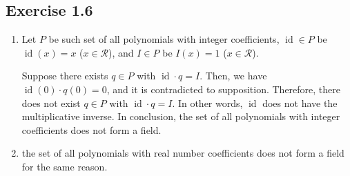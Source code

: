 \documentclass{article}
\newcommand\R{\mathcal R}
\DeclareMathOperator \id{id}
\begin{document}
\subsection{Exercise 1.6}
\begin{enumerate}[label = (\alph*)]
\item
Let $P$ be such set of all polynomials with integer coefficients, %
$\id \in P$ be $\id(x) = x$ ($x \in \R$), and 
$I \in P$ be $I(x) = 1$ ($x \in \R$).

Suppose there exists $q \in P$ with ${\id} \cdot q = I$.
Then, we have $\id(0) \cdot q(0) = 0$, and it is contradicted to supposition.
Therefore, there does not exist  $q \in P$ with ${\id} \cdot q = I$. In other words, $\id$ does not have the multiplicative inverse.
In conclusion, the set of all polynomials with integer coefficients does not form a field.   
\item
the set of all polynomials with real number coefficients does not form a field for the same reason.   
\end{enumerate}
\end{document}
